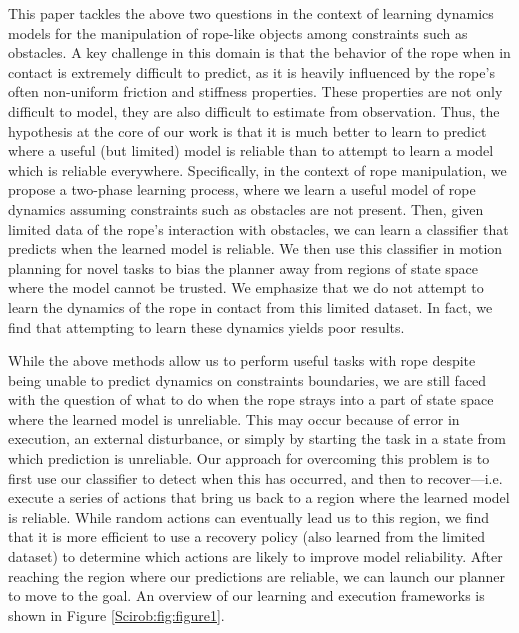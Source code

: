This paper tackles the above two questions in the context of learning dynamics models for the manipulation of rope-like objects among constraints such as obstacles. A key challenge in this domain is that the behavior of the rope when in contact is extremely difficult to predict, as it is heavily influenced by the rope’s often non-uniform friction and stiffness properties. These properties are not only difficult to model, they are also difficult to estimate from observation. Thus, the hypothesis at the core of our work is that it is much better to learn to predict where a useful (but limited) model is reliable than to attempt to learn a model which is reliable everywhere. Specifically, in the context of rope manipulation, we propose a two-phase learning process, where we learn a useful model of rope dynamics assuming constraints such as obstacles are not present. Then, given limited data of the rope’s interaction with obstacles, we can learn a classifier that predicts when the learned model is reliable. We then use this classifier in motion planning for novel tasks to bias the planner away from regions of state space where the model cannot be trusted. We emphasize that we do not attempt to learn the dynamics of the rope in contact from this limited dataset. In fact, we find that attempting to learn these dynamics yields poor results.

While the above methods allow us to perform useful tasks with rope despite being unable to predict dynamics on constraints boundaries, we are still faced with the question of what to do when the rope strays into a part of state space where the learned model is unreliable. This may occur because of error in execution, an external disturbance, or simply by starting the task in a state from which prediction is unreliable. Our approach for overcoming this problem is to first use our classifier to detect when this has occurred, and then to recover—i.e. execute a series of actions that bring us back to a region where the learned model is reliable. While random actions can eventually lead us to this region, we find that it is more efficient to use a recovery policy (also learned from the limited dataset) to determine which actions are likely to improve model reliability. After reaching the region where our predictions are reliable, we can launch our planner to move to the goal. An overview of our learning and execution frameworks is shown in Figure \ref{Scirob:fig:figure1}.

